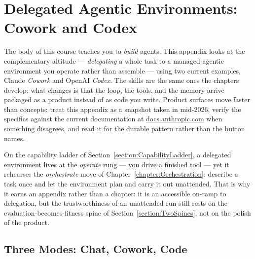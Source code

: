 \chapter{Delegated Agentic Environments: Cowork and Codex}
\label{chapter:CoworkReference}

The body of this course teaches you to \emph{build} agents.
This appendix looks at the complementary altitude --- \emph{delegating} a whole task to a managed agentic environment you operate rather than assemble --- using two current examples, Claude \emph{Cowork} and OpenAI \emph{Codex}.
The skills are the same ones the chapters develop; what changes is that the loop, the tools, and the memory arrive packaged as a product instead of as code you write.
Product surfaces move faster than concepts: treat this appendix as a snapshot taken in mid-2026, verify the specifics against the current documentation at \href{https://docs.anthropic.com}{docs.anthropic.com} when something disagrees, and read it for the durable pattern rather than the button names.

On the capability ladder of Section~\ref{section:CapabilityLadder}, a delegated environment lives at the \emph{operate} rung --- you drive a finished tool --- yet it rehearses the \emph{orchestrate} move of Chapter~\ref{chapter:Orchestration}: describe a task once and let the environment plan and carry it out unattended.
That is why it earns an appendix rather than a chapter: it is an accessible on-ramp to delegation, but the trustworthiness of an unattended run still rests on the evaluation-becomes-fitness spine of Section~\ref{section:TwoSpines}, not on the polish of the product.

\section{Three Modes: Chat, Cowork, Code}

